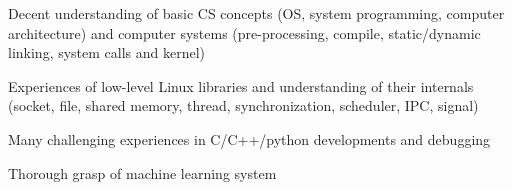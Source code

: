 


\begin{cventries}

\begin{small}
    {
      \begin{cvitems} %
        \item {Decent understanding of basic CS concepts (OS, system programming, computer architecture) and computer systems (pre-processing, compile, static/dynamic linking, system calls and kernel)}
	\item {Experiences of low-level Linux libraries and understanding of their internals (socket, file, shared memory, thread, synchronization, scheduler, IPC, signal)}
	\item {Many challenging experiences in C/C++/python developments and debugging}
	\item {Thorough grasp of machine learning system}
	\newline
      \end{cvitems}
    }
\end{small}

\end{cventries}


